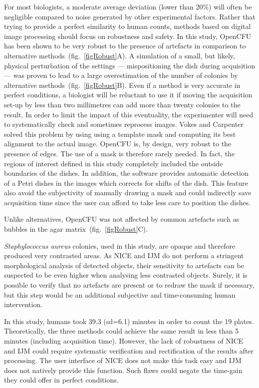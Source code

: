 \documentclass[10pt]{article}
\newcommand{\sa}{\emph{Staphylococcus aureus}}
\newcommand{\humantime}{39.3 (sd=6.1)}
\newcommand{\IJM}{IJM}
\begin{document}
For most biologists, a moderate average deviation (lower than 20\%) will often be
negligible compared to noise generated by other experimental factors.
Rather that trying to provide a perfect similarity to human counts, methods
based on digital image processing should focus on robustness and safety.
In this study, OpenCFU has been shown to be very robust to the presence of
artefacts in comparison to alternative methods~(fig.~\ref{figRobust}A). A
simulation of a small, but likely, physical perturbation of the settings ---
mispositioning the dish during acquisition --- was proven to lead to a large
overestimation of the number of colonies by alternative
methods~(fig.~\ref{figRobust}B).
Even if a method is very accurate in perfect conditions, a biologist will be
reluctant to use it if moving the acquisition set-up by less than two
millimetres can add more than twenty colonies to the result.
In order to limit the impact of this eventuality, the experimenter will need to
systematically check and sometimes reprocess images.
Vokes and Carpenter \cite{vokes_using_2008} solved this problem by using using a
template mask and computing its best alignment to the actual image.
OpenCFU is, by design, very robust to the presence of edges. The use of a mask is
therefore rarely needed. In fact, the regions of interest defined in this study
completely included the outside boundaries of the dishes.
In addition, the software provides automatic detection of a Petri dishes in
the images which corrects for shifts of the dish. This feature also avoid the
subjectivity of manually drawing a mask and could indirectly save acquisition
time since the user can afford to take less care to position the dishes.

Unlike alternatives, OpenCFU was not affected by common artefacts such as bubbles in the agar matrix~(fig.~\ref{figRobust}C).  

 \sa{} colonies, used in this study, are opaque and therefore produced very
contrasted areas. As NICE and \IJM{} do not perform a stringent
morphological analysis of detected objects, their sensitivity to artefacts can be
suspected to be even higher when analysing less contrasted objects.
Surely, it is possible to verify that no artefacts are present or to redraw the
mask if necessary, but this step would be an additional subjective and
time-consuming human intervention.

In this study, humans took \humantime{} minutes in order to count the 19 plates.
Theoretically, the three methods could achieve the same result in less
than 5 minutes (including acquisition time). However, the lack of robustness of
NICE and \IJM{} could require systematic verification and
rectification of the results after processing. The user interface of NICE does not make this task easy and \IJM{} does not natively
provide this function. Such flaws could negate the time-gain they
could offer in perfect conditions.
\end{document}
